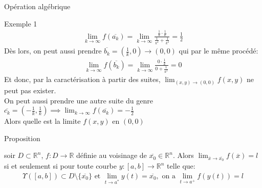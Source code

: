 \begin{parag}{Opération algébrique}
\begin{subparag}{Exemple 1}
        \begin{align*}
            \lim_{ k \to \infty} f( \overline{a_k}) = \lim_{k \to\infty} \frac{ \frac{1}{k} \cdot \frac{1}{k}}{ \frac{1}{k^2} + \frac{1}{k^2}} = \frac{1}{2}
        \end{align*}
        Dès lors, on peut aussi prendre $ \overline{b_k} = ( \frac{1}{k},0) \to (0, 0)$ qui par le même procédé:
        \begin{align*}
            \lim_{k \to \infty} f( \overline{b_k}) = \lim_{k \to \infty} \frac{ 0 \cdot \frac{1}{k}}{0 + \frac{1}{k^2}} = 0
        \end{align*}
        Et donc, par la caractérisation à partir des suites, $\lim_{(x, y) \to (0, 0)} f(x, y)$ ne peut pas exister.\\
        On peut aussi prendre une autre suite du genre $ \overline{c_k} = ( - \frac{1}{k}, \frac{1}{k}) \implies \lim_{k \to \infty} f( \overline{a_k}) = - \frac{1}{2}$\\
        Alors quelle est la limite $f(x, y)$ en $(0, 0)$
         \begin{center}
     
     
 \end{center}
 
    \end{subparag}
    \begin{subparag}{Proposition}
        \begin{theoreme}
            soir $D \subset \mathbb{R}^n $, $f: D \to \mathbb{R}$ définie au voisinage de $ \overline{x_0} \in \mathbb{R}^n $. Alors $\lim_{ \overline{x} \to \overline{x_0}}f( \overline{x}) =l$ si et seulement si pour toute courbe $ y: [a, b] \to \mathbb{R}^n $ telle que:
            \begin{align*}
                 \Upsilon([a, b]) \subset D \setminus\{ \overline{x_0}\} \text{ et } \lim_{t \to a^*} y(t) = \overline{x_0}, \text{ on a } \lim_{t \to a^+} f(y(t)) = l
            \end{align*}
           

\end{theoreme}
\end{subparag}
\end{parag}
